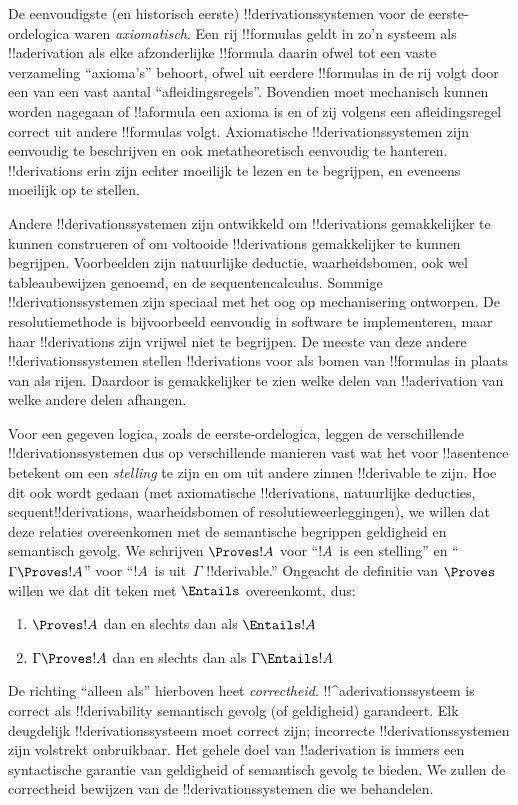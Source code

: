 \documentclass[openany]{memoir}
\begin{document}
De eenvoudigste (en historisch eerste) !!{derivation}ssystemen voor
de eerste-ordelogica waren \emph{axiomatisch}. Een rij !!{formula}s
geldt in zo'n systeem als !!a{derivation} als elke afzonderlijke
!!{formula} daarin ofwel tot een vaste verzameling ``axioma's''
behoort, ofwel uit eerdere !!{formula}s in de rij volgt door een van
een vast aantal ``afleidingsregels''. Bovendien moet mechanisch kunnen
worden nagegaan of !!a{formula} een axioma is en of zij volgens een
afleidingsregel correct uit andere !!{formula}s volgt. Axiomatische
!!{derivation}ssystemen zijn eenvoudig te beschrijven en ook
metatheoretisch eenvoudig te hanteren. !!{derivation}s erin zijn echter
moeilijk te lezen en te begrijpen, en eveneens moeilijk op te stellen.

Andere !!{derivation}ssystemen zijn ontwikkeld om !!{derivation}s
gemakkelijker te kunnen construeren of om voltooide !!{derivation}s
gemakkelijker te kunnen begrijpen. Voorbeelden zijn natuurlijke
deductie, waarheidsbomen, ook wel tableaubewijzen genoemd, en de
sequentencalculus. Sommige !!{derivation}ssystemen zijn speciaal met
het oog op mechanisering ontworpen. De resolutiemethode is bijvoorbeeld
eenvoudig in software te implementeren, maar haar !!{derivation}s zijn
vrijwel niet te begrijpen. De meeste van deze andere
!!{derivation}ssystemen stellen !!{derivation}s voor als bomen van
!!{formula}s in plaats van als rijen. Daardoor is gemakkelijker te
zien welke delen van !!a{derivation} van welke andere delen afhangen.

Voor een gegeven logica, zoals de eerste-ordelogica, leggen de
verschillende !!{derivation}ssystemen dus op verschillende manieren vast
wat het voor !!a{sentence} betekent om een \emph{stelling} te zijn
en om uit andere zinnen !!{derivable} te zijn. Hoe dit ook wordt gedaan
(met axiomatische !!{derivation}s, natuurlijke deducties,
sequent!!{derivation}s, waarheidsbomen of resolutieweerleggingen), we
willen dat deze relaties overeenkomen met de semantische begrippen
geldigheid en semantisch gevolg. We schrijven $\Proves !A$ voor
``$!A$~is een stelling'' en ``$\Gamma \Proves !A$'' voor
``$!A$~is uit~$\Gamma$ !!{derivable}.'' Ongeacht de definitie van
$\Proves$ willen we dat dit teken met $\Entails$ overeenkomt, dus:
\begin{enumerate}
\item $\Proves !A$ dan en slechts dan als $\Entails !A$
\item $\Gamma \Proves !A$ dan en slechts dan als $\Gamma \Entails !A$
\end{enumerate}
De richting ``alleen als'' hierboven heet \emph{correctheid}.
!!^a{derivation}ssysteem is correct als !!{derivability} semantisch
gevolg (of geldigheid) garandeert. Elk deugdelijk
!!{derivation}ssysteem moet correct zijn; incorrecte
!!{derivation}ssystemen zijn volstrekt onbruikbaar. Het gehele doel van
!!a{derivation} is immers een syntactische garantie van geldigheid of
semantisch gevolg te bieden. We zullen de correctheid bewijzen van de
!!{derivation}ssystemen die we behandelen.
\end{document}
